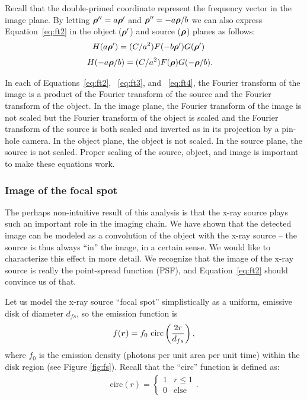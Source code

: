 \documentclass[mphy386-notes.tex]{subfiles}
\begin{document}
Recall that the double-primed coordinate represent the frequency vector
in the image plane.  By letting $\boldsymbol{\rho}'' = a\boldsymbol{\rho}'$ and 
$\boldsymbol{\rho}'' = -a\boldsymbol{\rho}/b$ we can also express Equation~\ref{eq:ft2} in the
object ($\boldsymbol{\rho}'$) and source ($\boldsymbol{\rho}$) planes as follows:
\begin{align}
  H(a\boldsymbol{\rho}') &= (C/a^2)F(-b\boldsymbol{\rho}')G(\boldsymbol{\rho}')\
  \label{eq:ft3}
\end{align}
\begin{align}
  H(-a\boldsymbol{\rho}/b) &= (C/a^2)F(\boldsymbol{\rho})G(-\boldsymbol{\rho}/b).
  \label{eq:ft4}
\end{align}

In each of Equations~\ref{eq:ft2}, ~\ref{eq:ft3}, and ~\ref{eq:ft4}, the Fourier transform of the image is a 
product of the Fourier transform of the source and the Fourier transform of the object.
In the image plane, the Fourier transform of the image is not scaled but the Fourier
transform of the object is scaled and the Fourier transform of the source is both scaled 
and inverted as in its projection by a pin-hole camera.  In the object plane, the object
is not scaled.  In the source plane, the source is not scaled.  Proper scaling of the source, object, and 
image is important to make these equations work.

\subsubsection{Image of the focal spot}

The perhaps non-intuitive result of this analysis is that the x-ray source plays
such an important role in the imaging chain. We have shown that the detected
image can be modeled as a convolution of the object with the x-ray source -- the
source is thus always ``in'' the image, in a certain sense. We would like to
characterize this effect in more detail.  We recognize that the image of the x-ray source
is really the point-spread function (PSF), and Equation~\ref{eq:ft2} should 
convince us of that.

Let us model the x-ray source ``focal spot'' simplistically as a uniform, emissive disk of
diameter $d_{fs}$, so the emission function is
\begin{align}
  f(\boldsymbol{r}) = f_0 \text{ circ}\left(\frac{2r}{d_{fs}}\right),
  \label{eq:fsdef}
\end{align}
where $f_0$ is the emission density (photons per unit area per unit time) within
the disk region (see Figure \ref{fig:fs}). Recall that the ``circ'' function is
defined as:
\begin{align}
  \text{circ}(r) =
  \begin{cases}
    1 & r \le 1\\
    0 & \text{else}
  \end{cases}.
\end{align}
\end{document}
